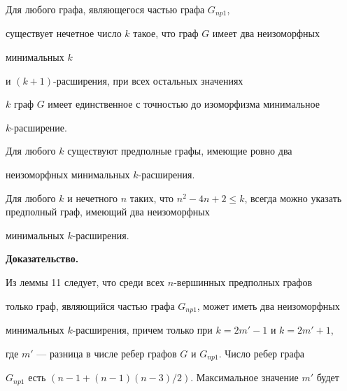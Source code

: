 \setcounter{cor}{0}





\begin{cor}


Для любого графа, являющегося частью графа $G_{np1}$,


существует нечетное число $k$ такое, что граф $G$ имеет два неизоморфных


минимальных $k$ 


и $(k+1)$-расширения, при всех остальных значениях


$k$ граф $G$ имеет единственное с точностью до изоморфизма минимальное


$k$-расширение.


\end{cor}





\begin{cor}


Для любого $k$ существуют предполные графы, имеющие ровно два


неизоморфных минимальных $k$-расширения.


\end{cor}





\begin{cor}


Для любого $k$ и нечетного $n$ таких, что $n^2 - 4n + 2 \leq


k$, всегда можно указать предполный граф, имеющий два неизоморфных


минимальных $k$-расширения.


\end{cor}





{\bf Доказательство.}


Из леммы 11 следует, что среди всех $n$-вершинных предполных графов


только граф, являющийся частью графа $G_{np1}$, может иметь два неизоморфных


минимальных $k$-расширения, причем только при $k = 2m'-1$ и $k = 2m'+1$,


где $m'$ --- разница в числе ребер графов $G$ и $G_{np1}$. Число ребер графа


$G_{np1}$ есть $(n-1+(n-1)(n-3)/2)$. Максимальное значение $m'$ будет



